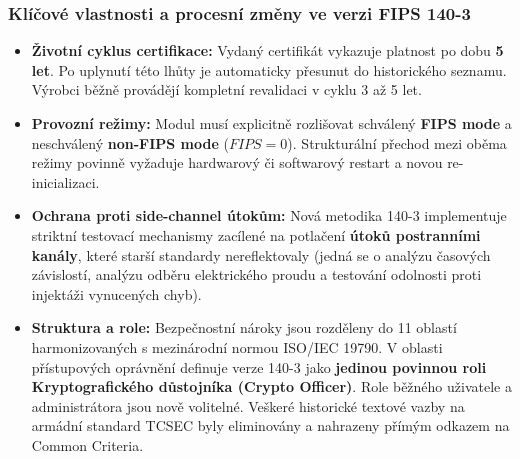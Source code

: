 \documentclass[10pt,a4paper]{article}
\begin{document}
	\subsubsection*{Klíčové vlastnosti a procesní změny ve verzi FIPS 140-3}
	\begin{itemize}
		\item \textbf{Životní cyklus certifikace:} Vydaný certifikát vykazuje platnost po dobu \textbf{5 let}. Po uplynutí této lhůty je automaticky přesunut do historického seznamu. Výrobci běžně provádějí kompletní revalidaci v cyklu 3 až 5 let.
		\item \textbf{Provozní režimy:} Modul musí explicitně rozlišovat schválený \textbf{FIPS mode} a neschválený \textbf{non-FIPS mode} ($FIPS=0$). Strukturální přechod mezi oběma režimy povinně vyžaduje hardwarový či softwarový restart a novou re-inicializaci.
		\item \textbf{Ochrana proti side-channel útokům:} Nová metodika 140-3 implementuje striktní testovací mechanismy zacílené na potlačení \textbf{útoků postranními kanály}, které starší standardy nereflektovaly (jedná se o analýzu časových závislostí, analýzu odběru elektrického proudu a testování odolnosti proti injektáži vynucených chyb).
		\item \textbf{Struktura a role:} Bezpečnostní nároky jsou rozděleny do 11 oblastí harmonizovaných s mezinárodní normou ISO/IEC 19790. V oblasti přístupových oprávnění definuje verze 140-3 jako \textbf{jedinou povinnou roli Kryptografického důstojníka (Crypto Officer)}. Role běžného uživatele a administrátora jsou nově volitelné. Veškeré historické textové vazby na armádní standard TCSEC byly eliminovány a nahrazeny přímým odkazem na Common Criteria.
	\end{itemize}
	
\end{document}
